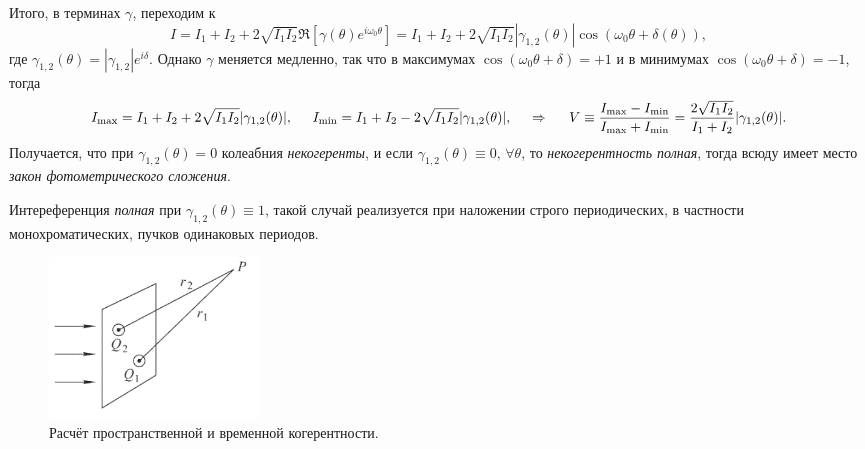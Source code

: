 Итого, в терминах $\gamma$, переходим к
\begin{equation*}
    I = I_1 + I_2 + 2 \sqrt{I_1 I_2} \Re\left[\gamma(\theta) e^{i \omega_0 \theta}\right] = 
    I_1 + I_2 + 2 \sqrt{I_1 I_2}  |\gamma_{1,2}(\theta)| \cos(\omega_0 \theta + \delta(\theta)),
\end{equation*}
где $\gamma_{1,2} (\theta) = |\gamma_{1, 2}|e^{i \delta}$. Однако $\gamma$ меняется медленно, так что в максимумах $\cos(\omega_0 \theta + \delta) = +1$ и в минимумах $\cos(\omega_0 \theta + \delta) = -1$, тогда
\begin{equation*}
    I_{\textnormal{max}} = I_1 + I_2 + 2 \sqrt{I_1 I_2} |\gamma_{1, 2} (\theta)|,
    \hspace{5 mm} 
    I_{\textnormal{min}} = I_1 + I_2 - 2 \sqrt{I_1 I_2} |\gamma_{1, 2} (\theta)|,
    \hspace{0.5cm} \Rightarrow \hspace{0.5cm}
    V \equiv \frac{I_{\textnormal{max}}-I_{\textnormal{min}}}{I_{\textnormal{max}}+I_{\textnormal{min}}} = \frac{2 \sqrt{I_1 I_2}}{I_1 + I_2} |\gamma_{1,2} (\theta)|.
\end{equation*}
Получается, что при $\gamma_{1, 2}(\theta) =0$ колеабния \textit{некогеренты}, и если $\gamma_{1, 2}(\theta) \equiv 0,\, \forall \theta$, то \textit{некогерентность полная}, тогда всюду имеет место \textit{закон фотометрического сложения}. 

Интереференция \textit{полная} при $\gamma_{1, 2}(\theta) \equiv 1$, такой случай реализуется при наложении строго
периодических, в частности монохроматических, пучков одинаковых периодов. 
\begin{figure}[h]
    \centering
    \includegraphics[width=0.27\textwidth]{figures/31_1.png}
    \caption{Расчёт пространственной и временной когерентности.}
    \label{fig:31}
\end{figure}


